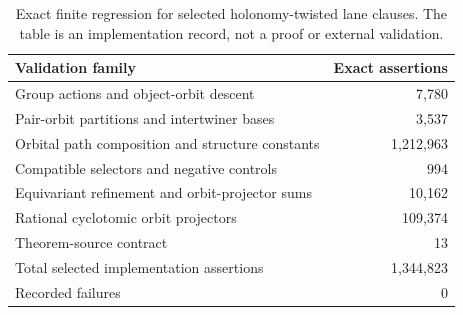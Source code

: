 \begin{table}[htbp]
\centering
\caption{Exact finite regression for selected holonomy-twisted lane clauses. The table is an implementation record, not a proof or external validation.}
\label{tab:block16-validation}
\begin{tabular}{@{}lr@{}}
\toprule
Validation family & Exact assertions\\
\midrule
Group actions and object-orbit descent & 7,780\\
Pair-orbit partitions and intertwiner bases & 3,537\\
Orbital path composition and structure constants & 1,212,963\\
Compatible selectors and negative controls & 994\\
Equivariant refinement and orbit-projector sums & 10,162\\
Rational cyclotomic orbit projectors & 109,374\\
Theorem-source contract & 13\\
\midrule
Total selected implementation assertions & 1,344,823\\
Recorded failures & 0\\
\bottomrule
\end{tabular}
\end{table}
